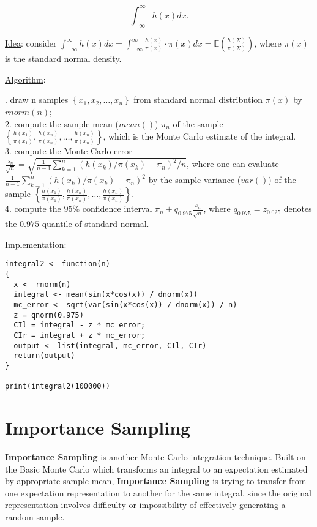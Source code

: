 \documentclass[12pt]{article}
\newcommand{\E}{\mathbb{E}}
\newcommand{\set}[1]{\left\{#1\right\}}
\newcommand{\paren}[1]{\left(#1\right)}
\numberwithin{equation}{subsection}
\begin{document}
$$ \int_{-\infty}^\infty h(x)dx. $$

\noindent
\underline{Idea}:
consider $\int_{-\infty}^\infty h(x)dx = \int_{-\infty}^\infty \frac{h(x)}{\pi(x)}\cdot\pi(x)dx = \E\paren{\frac{h(X)}{\pi(X)}}$, where $\pi(x)$ is the standard normal density. \newline

\noindent
\underline{Algorithm}: 

. draw n samples $\set{x_1, x_2, \dots, x_n}$ from standard normal distribution $\pi(x)$ by $rnorm(n)$;\\
2. compute the sample mean ($mean()$) $\pi_n$ of the sample $\set{\frac{h(x_1)}{\pi(x_1)}, \frac{h(x_n)}{\pi(x_n)}, \dots, \frac{h(x_n)}{\pi(x_n)}}$, which is the Monte Carlo estimate of the integral.\\
3. compute the Monte Carlo error $\frac{s_n}{\sqrt{n}} = \sqrt{\frac{1}{n-1}\sum\limits_{k=1}^n\paren{h(x_k)/\pi(x_k)-\pi_n}^2 / n}$, where one can evaluate $\frac{1}{n-1}\sum\limits_{k=1}^n\paren{h(x_k)/\pi(x_k)-\pi_n}^2$ by the sample variance ($var()$) of the sample $\set{\frac{h(x_1)}{\pi(x_1)}, \frac{h(x_n)}{\pi(x_n)}, \dots, \frac{h(x_n)}{\pi(x_n)}}$.\\
4. compute the $95\%$ confidence interval $\pi_n \pm q_{0.975}\frac{s_n}{\sqrt{n}}$, where $q_{0.975}=z_{0.025}$ denotes the $0.975$ quantile of standard normal.
\newline

\noindent
\underline{Implementation}:
\begin{verbatim}
integral2 <- function(n)
{
  x <- rnorm(n)
  integral <- mean(sin(x*cos(x)) / dnorm(x))
  mc_error <- sqrt(var(sin(x*cos(x)) / dnorm(x)) / n)
  z = qnorm(0.975)
  CIl = integral - z * mc_error;
  CIr = integral + z * mc_error;
  output <- list(integral, mc_error, CIl, CIr)
  return(output)
}

print(integral2(100000))
\end{verbatim}

\newpage
\section{Importance Sampling}

\textbf{Importance Sampling} is another Monte Carlo integration technique. Built on the Basic Monte Carlo which transforms an integral to an expectation estimated by appropriate sample mean, \textbf{Importance Sampling} is trying to transfer from one expectation representation to another for the same integral, since the original representation involves difficulty or impossibility of effectively generating a random sample. \newline
\end{document}
